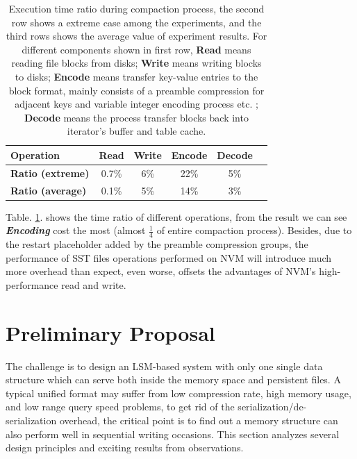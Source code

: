  
\begin{table}[t]
	\centering
	\begin{tabular}{|l|c|c|c|c|c|}
		\hline
		\textbf{Operation} & Read & Write & Encode & Decode  \\ \hline
		\textbf{Ratio (extreme)} & 0.7\% & 6\% & 22\% & 5\%  \\ \hline
		\textbf{Ratio (average)} & 0.1\% & 5\% & 14\% & 3\%  \\ \hline
	\end{tabular}
	\caption{Execution time ratio during compaction process, the second row shows a extreme case among the experiments, and the third rows shows the average value of experiment results. For different components shown in first row, \textbf{Read} means reading file blocks from disks; \textbf{Write} means writing blocks to disks; \textbf{Encode} means transfer key-value entries to the block format, mainly consists of a preamble compression for adjacent keys and variable integer encoding process etc. ; \textbf{Decode} means the process transfer blocks back into iterator's buffer and table cache.}
	\label{tab:file_read_ratio}
\end{table}

Table. \ref{tab:file_read_ratio}. shows the time ratio of different operations, from the result we can see \textbf{\textit{Encoding}} cost the most (almost $\frac{1}{4}$ of entire compaction process). Besides, due to the restart placeholder added by the preamble compression groups, the performance of SST files operations performed on NVM will introduce much more overhead than expect, even worse, offsets the advantages of NVM's high-performance read and write.

\section{Preliminary Proposal}
The challenge is to design an LSM-based system with only one single data structure which can serve both inside the memory space and persistent files. A typical unified format may suffer from low compression rate, high memory usage, and low range query speed problems, to get rid of the serialization/de-serialization overhead, the critical point is to find out a memory structure can also perform well in sequential writing occasions. This section analyzes several design principles and exciting results from observations.


